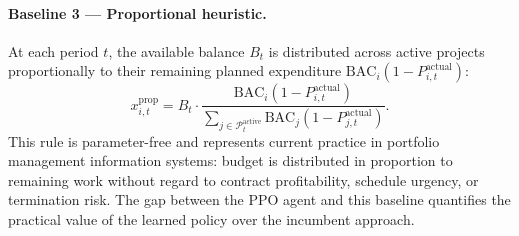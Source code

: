 \paragraph{Baseline 3 --- Proportional heuristic.}
At each period $t$, the available balance $B_t$ is distributed across
active projects proportionally to their remaining planned expenditure
$\mathrm{BAC}_i(1 - P_{i,t}^{\mathrm{actual}})$:
\begin{equation}
  x_{i,t}^{\mathrm{prop}}
    = B_t \cdot
      \frac{\mathrm{BAC}_i(1 - P_{i,t}^{\mathrm{actual}})}
           {\displaystyle\sum_{j \in \mathcal{P}_t^{\mathrm{active}}}
            \mathrm{BAC}_j(1 - P_{j,t}^{\mathrm{actual}})}.
  \label{eq:heuristic}
\end{equation}
This rule is parameter-free and represents current practice in
portfolio management information systems: budget is distributed
in proportion to remaining work without regard to contract
profitability, schedule urgency, or termination risk. The gap between
the PPO agent and this baseline quantifies the practical value of the
learned policy over the incumbent approach.